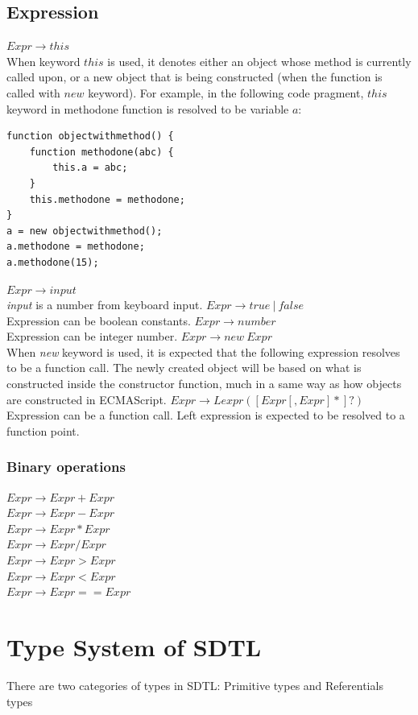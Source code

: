 \documentclass[a4paper,12pt]{article}
\begin{document}
\subsection{Expression}
$Expr \rightarrow this$\\
When keyword $this$ is used, it denotes either an object whose method is currently called upon, or a new object that is being constructed (when the function is called with $new$ keyword). For example, in the following code pragment, $this$ keyword in methodone function is resolved to be variable $a$:\\
\begin{lstlisting}[caption=this]
function objectwithmethod() {
	function methodone(abc) {
		this.a = abc;
	}
	this.methodone = methodone;
}
a = new objectwithmethod();
a.methodone = methodone;
a.methodone(15);
\end{lstlisting}
$Expr \rightarrow input$\\
\textit{input} is a number from keyboard input.
$Expr \rightarrow true\ |\ false$\\
Expression can be boolean constants.
$Expr \rightarrow number$\\
Expression can be integer number.
$Expr \rightarrow new\  Expr$\\
When \textit{new} keyword is used, it is expected that the following expression resolves to be a function call. The newly created object will be based on what is constructed inside the constructor function, much in a same way as how objects are constructed in ECMAScript.
$Expr \rightarrow Lexpr ([Expr[,Expr]*]?)$\\
Expression can be a function call. Left expression is expected to be resolved to a function point.
\subsubsection{Binary operations}
$Expr \rightarrow Expr + Expr$\\
$Expr \rightarrow Expr - Expr$\\
$Expr \rightarrow Expr * Expr$\\
$Expr \rightarrow Expr / Expr$\\
$Expr \rightarrow Expr > Expr$\\
$Expr \rightarrow Expr < Expr$\\
$Expr \rightarrow Expr == Expr$\\

\section{Type System of SDTL}
There are two categories of types in SDTL: Primitive types and Referentials types
\end{document}
